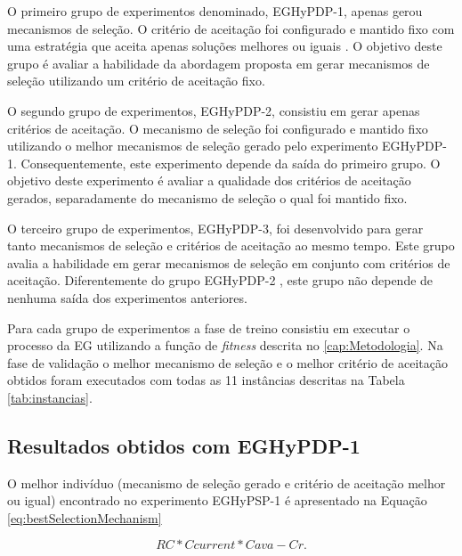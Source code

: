 O primeiro grupo de experimentos denominado, EGHyPDP-1, apenas gerou mecanismos de seleção. O critério de aceitação foi configurado e mantido fixo com uma estratégia que aceita apenas soluções melhores ou iguais \cite{burke2013hyper}. O objetivo deste grupo é avaliar a habilidade da abordagem proposta em gerar mecanismos de seleção utilizando um critério de aceitação fixo.

	O segundo grupo de experimentos, EGHyPDP-2, consistiu em gerar apenas critérios de aceitação. O mecanismo de seleção foi configurado e mantido fixo utilizando o melhor mecanismos de seleção gerado pelo experimento EGHyPDP-1. Consequentemente, este experimento depende da saída do primeiro grupo. O objetivo deste experimento é avaliar a qualidade dos critérios de aceitação gerados, separadamente do mecanismo de seleção o qual foi mantido fixo.
	
	O terceiro grupo de experimentos,  EGHyPDP-3, foi desenvolvido para gerar tanto mecanismos de seleção e critérios de aceitação ao mesmo tempo. Este grupo avalia a habilidade em gerar mecanismos de seleção em conjunto com critérios de aceitação. Diferentemente do grupo EGHyPDP-2  , este grupo não depende de nenhuma saída dos experimentos anteriores.


	Para cada grupo de experimentos a fase de treino consistiu em executar o processo da EG utilizando a função de \textit{fitness} descrita no \ref{cap:Metodologia}. Na fase de validação o melhor mecanismo de seleção e o melhor critério de aceitação obtidos foram  executados com todas as 11 instâncias descritas na Tabela \ref{tab:instancias}. 
	

	
	\subsection{Resultados obtidos com EGHyPDP-1}
	\label{subsection:gehypdp1results}
	
	O melhor indivíduo (mecanismo de seleção gerado e critério de aceitação melhor ou igual) encontrado no experimento EGHyPSP-1 é apresentado na Equação \ref{eq:bestSelectionMechanism}
	
	\begin{equation}
	\label{eq:bestSelectionMechanism}
	RC * Ccurrent * Cava -Cr.
	\end{equation}
	

